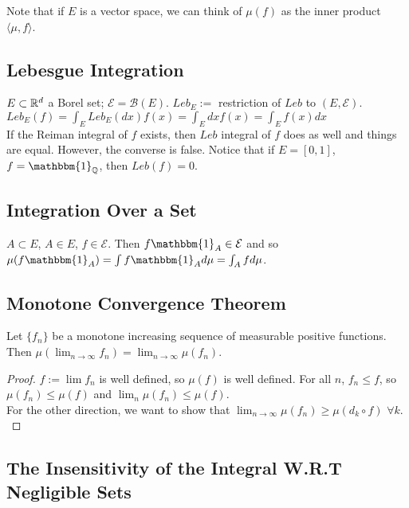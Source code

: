 \documentclass[english, course]{Notes}
\begin{document}
Note that if $E$ is a vector space, we can think of $\mu(f)$ as the inner product $\langle \mu, f \rangle$.\\

\subsection{Lebesgue Integration}
$E \subset \mathbb{R}^d$ a Borel set; $\mathcal{E} = \mathcal{B}(E)$. $Leb_{E} :=$ restriction of $Leb$ to $(E, \mathcal{E})$.\\

$Leb_E(f) = \int_E Leb_E(dx)f(x) = \int_E dxf(x) = \int_E f(x)dx$\\

If the Reiman integral of $f$ exists, then $Leb$ integral of $f$ does as well and things are equal. However, the converse is false. Notice that if $E = [0, 1]$, $f = \mathbbm{1}_\Q$, then $Leb(f) = 0$.\\

\subsection{Integration Over a Set}
$A \subset E$, $A \in E$, $f \in \mathcal{E}$. Then $f \mathbbm{1}_A \in \mathcal{E}$ and so $\mu(f \mathbbm{1}_A) = \int f \mathbbm{1}_A d\mu = \int_A f d\mu$.

\subsection{Monotone Convergence Theorem}

\begin{theorem}
Let $\{f_n\}$ be a monotone increasing sequence of measurable positive functions. Then $\mu(\lim_{n \to \infty} f_n) = \lim_{n \to \infty} \mu(f_n)$.
\end{theorem}

\begin{proof}
$f := \lim f_n$ is well defined, so $\mu(f)$ is well defined. For all $n$, $f_n \leq f$, so $\mu(f_n) \leq \mu(f)$ and $\lim_n \mu(f_n) \leq \mu(f)$.\\

For the other direction, we want to show that $\lim_{n \to \infty} \mu(f_n) \geq \mu(d_k \circ f)$ $\forall k$.\\
\end{proof}

\subsection{The Insensitivity of the Integral W.R.T Negligible Sets}
\end{document}
